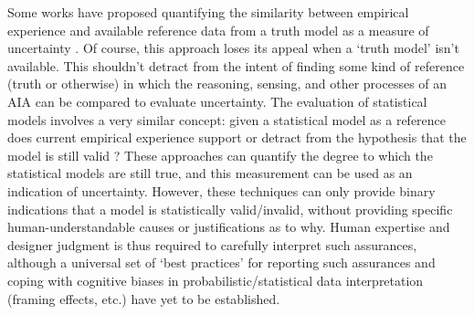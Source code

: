 Some works have proposed quantifying the similarity between empirical experience and available reference data from a truth model as a measure of uncertainty \cite{Kaipa2015-hy}. Of course, this approach loses its appeal when a `truth model' isn't available. This shouldn't detract from the intent of finding some kind of reference (truth or otherwise) in which the reasoning, sensing, and other processes of an AIA can be compared to evaluate uncertainty. The evaluation of statistical models involves a very similar concept: given a statistical model as a reference does current empirical experience support or detract from the hypothesis that the model is still valid \cite{Laskey1995-jp,Ghosh2016-dl}? These approaches can quantify the degree to which the statistical models are still true, and this measurement can be used as an indication of uncertainty. However, these techniques can only provide binary indications that a model is statistically valid/invalid, without providing specific human-understandable causes or justifications as to why. Human expertise and designer judgment is thus required to carefully interpret such assurances, although a universal set of `best practices' for reporting such assurances and coping with cognitive biases in probabilistic/statistical data interpretation (framing effects, etc.) have yet to be established. 
%
